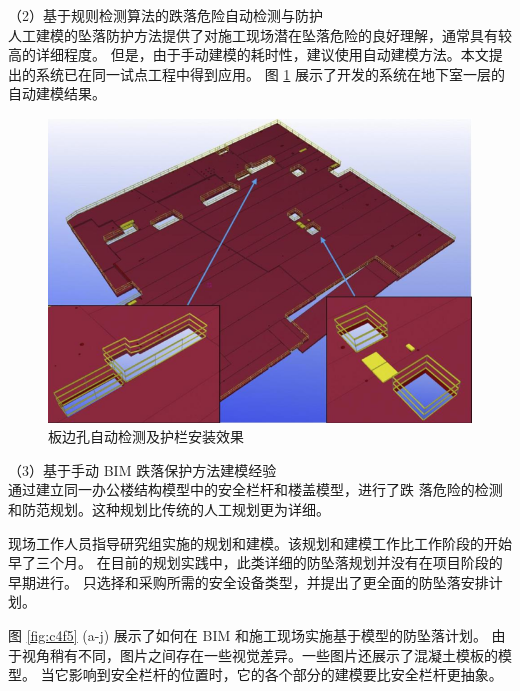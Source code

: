 （2）基于规则检测算法的跌落危险自动检测与防护\\

人工建模的坠落防护方法提供了对施工现场潜在坠落危险的良好理解，通常具有较高的详细程度。
但是，由于手动建模的耗时性，建议使用自动建模方法。本文提出的系统已在同一试点工程中得到应用。
图 \ref{fig:c4f4} 展示了开发的系统在地下室一层的自动建模结果。\\

\begin{figure}[thbp!]
    \centering
    \includegraphics[width=1.0\linewidth]{res/c4f4.png}
    \caption{板边孔自动检测及护栏安装效果}
    \label{fig:c4f4}
\end{figure}


（3）基于手动 BIM 跌落保护方法建模经验\\

通过建立同一办公楼结构模型中的安全栏杆和楼盖模型，进行了跌
落危险的检测和防范规划。这种规划比传统的人工规划更为详细。

现场工作人员指导研究组实施的规划和建模。该规划和建模工作比工作阶段的开始早了三个月。
在目前的规划实践中，此类详细的防坠落规划并没有在项目阶段的早期进行。
只选择和采购所需的安全设备类型，并提出了更全面的防坠落安排计划。

图 \ref{fig:c4f5} (a-j) 展示了如何在 BIM 和施工现场实施基于模型的防坠落计划。
由于视角稍有不同，图片之间存在一些视觉差异。一些图片还展示了混凝土模板的模型。
当它影响到安全栏杆的位置时，它的各个部分的建模要比安全栏杆更抽象。

